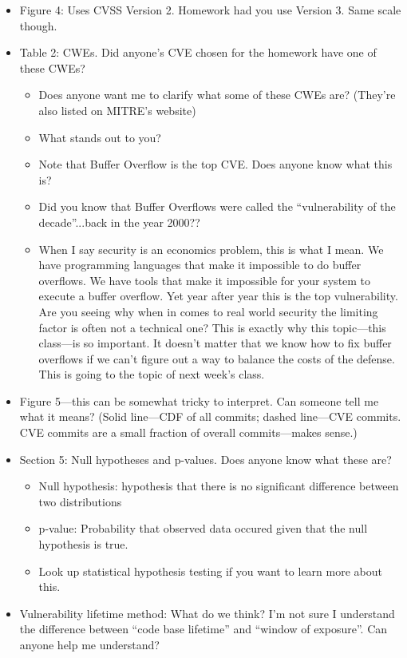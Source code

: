 \documentclass[11pt]{article}
\begin{document}
\begin{itemize}
    \item Figure 4: Uses CVSS Version 2. Homework had you use Version 3. Same scale though. 
    \item Table 2: CWEs. Did anyone's CVE chosen for the homework have one of these CWEs?
    \begin{itemize}
        \item Does anyone want me to clarify what some of these CWEs are? (They're also listed on MITRE's website)
        \item What stands out to you?
        \item Note that Buffer Overflow is the top CVE. Does anyone know what this is?
        \item Did you know that Buffer Overflows were called the ``vulnerability of the decade''...back in the year 2000??
        \item When I say security is an economics problem, this is what I mean. We have programming languages that make it impossible to do buffer overflows. We have tools that make it impossible for your system to execute a buffer overflow. Yet year after year this is the top vulnerability. Are you seeing why when in comes to real world security the limiting factor is often not a technical one? This is exactly why this topic---this class---is so important. It doesn't matter that we know how to fix buffer overflows if we can't figure out a way to balance the costs of the defense. This is going to the topic of next week's class.
    \end{itemize}
    \item Figure 5---this can be somewhat tricky to interpret. Can someone tell me what it means? (Solid line---CDF of all commits; dashed line---CVE commits. CVE commits are a small fraction of overall commits---makes sense.)
    \item Section 5: Null hypotheses and p-values. Does anyone know what these are?
    \begin{itemize}
        \item Null hypothesis: hypothesis that there is no significant difference between two distributions
        \item p-value: Probability that observed data occured given that the null hypothesis is true. 
        \item Look up statistical hypothesis testing if you want to learn more about this.
    \end{itemize}
    \item Vulnerability lifetime method: What do we think? I'm not sure I understand the difference between ``code base lifetime'' and ``window of exposure''. Can anyone help me understand?

\end{itemize}
\end{document}
